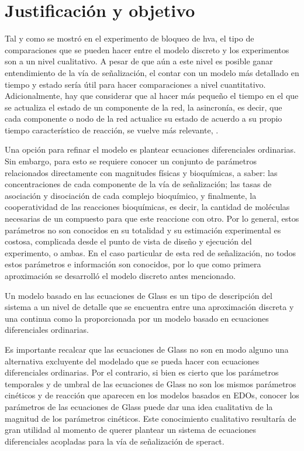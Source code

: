 \section{Justificación y objetivo}

Tal y como se mostró en el experimento de bloqueo de \ac{hva}, el tipo de comparaciones que se pueden hacer entre el modelo discreto y los experimentos son a un nivel cualitativo. A pesar de que aún a este nivel es posible ganar entendimiento de la vía de señalización, el contar con un modelo más detallado en tiempo y estado sería útil para hacer comparaciones a nivel cuantitativo.
Adicionalmente, hay que considerar que al hacer más pequeño el tiempo en el que se actualiza el estado de un componente de la red, la asincronía, es decir, que cada componente o nodo de la red actualice su estado de acuerdo a su propio tiempo característico de reacción, se vuelve más relevante, \citeauthor{Reka3Nodos2010} \citep{Reka3Nodos2010}.

Una opción para refinar el modelo es plantear ecuaciones diferenciales ordinarias. Sin embargo, para esto se requiere conocer un conjunto de parámetros relacionados directamente con magnitudes físicas y bioquímicas, a saber: las concentraciones de cada componente de la vía de señalización; las tasas de asociación y disociación de cada complejo bioquímico, y finalmente, la cooperatividad de las reacciones bioquímicas, es decir, la cantidad de moléculas necesarias de un compuesto para que este reaccione con otro. Por lo general, estos parámetros no son conocidos en su totalidad y su estimación experimental es costosa, complicada desde el punto de vista de diseño y ejecución del experimento, o ambas. En el caso particular de esta red de señalización, no todos estos parámetros e información son conocidos, por lo que como primera aproximación se desarrolló el modelo discreto antes mencionado.

Un modelo basado en las ecuaciones de Glass es un tipo de descripción del sistema a un nivel de detalle que se encuentra entre una aproximación discreta y una continua como la proporcionada por un modelo basado en ecuaciones diferenciales ordinarias.

Es importante recalcar que las ecuaciones de Glass no son en modo alguno una alternativa excluyente del modelado que se pueda hacer con ecuaciones diferenciales ordinarias. Por el contrario, si bien es cierto que los parámetros temporales y de umbral de las ecuaciones de Glass no son los mismos parámetros cinéticos y de reacción que aparecen en los modelos basados en \ac{EDOs}, conocer los parámetros de las ecuaciones de Glass puede dar una idea cualitativa de la magnitud de los parámetros cinéticos. Este conocimiento cualitativo resultaría de gran utilidad al momento de querer plantear un sistema de ecuaciones diferenciales acopladas para la vía de señalización de speract.


